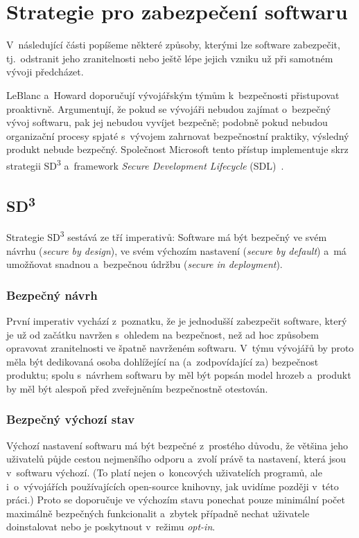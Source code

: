 \section{Strategie pro zabezpečení softwaru}

V~následující části popíšeme některé způsoby, kterými lze software zabezpečit, tj.\ odstranit jeho zranitelnosti nebo ještě lépe jejich vzniku už při samotném vývoji předcházet.

LeBlanc a~Howard \cite{leblanc2002writing} doporučují vývojářským týmům k~bezpečnosti přistupovat proaktivně. Argumentují, že pokud se vývojáři nebudou zajímat o~bezpečný vývoj softwaru, pak jej nebudou vyvíjet bezpečně; podobně pokud nebudou organizační procesy spjaté s~vývojem zahrnovat bezpečnostní praktiky, výsledný produkt nebude bezpečný. Společnost Microsoft tento přístup implementuje skrz strategii SD\textsuperscript{3} a~framework \textit{Secure Development Lifecycle} (SDL)~\cite{mssdl}.

\subsection{\texorpdfstring{SD\textsuperscript{3}}{SD3}}

Strategie SD\textsuperscript{3} sestává ze tří imperativů: Software má být bezpečný ve svém návrhu (\textit{secure by design}), ve svém výchozím nastavení (\textit{secure by default}) a~má umožňovat snadnou a~bezpečnou údržbu (\textit{secure in deployment}).~\cite{leblanc2002writing}

\subsubsection*{Bezpečný návrh}

První imperativ vychází z~poznatku, že je jednodušší zabezpečit software, který je už od začátku navržen s~ohledem na bezpečnost, než ad hoc způsobem opravovat zranitelnosti ve špatně na\-vr\-že\-ném softwaru. V~týmu vývojářů by proto měla být dedikovaná osoba dohlížející na (a~zodpovídající za) bezpečnost produktu; spolu s~návrhem softwaru by měl být popsán model hrozeb a~produkt by měl být alespoň před zveřejněním bezpečnostně otestován.

\subsubsection*{Bezpečný výchozí stav}

Výchozí nastavení softwaru má být bezpečné z~prostého důvodu, že většina jeho uživatelů půjde cestou nejmenšího odporu a~zvolí právě ta nastavení, která jsou v~softwaru výchozí. (To platí nejen o~koncových uživatelích programů, ale i~o~vývojářích používajících open-source knihovny, jak uvidíme později v~této práci.) Proto se doporučuje ve výchozím stavu ponechat pouze minimální počet maximálně bezpečných funkcionalit a~zbytek případně nechat uživatele doinstalovat nebo je poskytnout v~režimu \emph{opt-in}.

